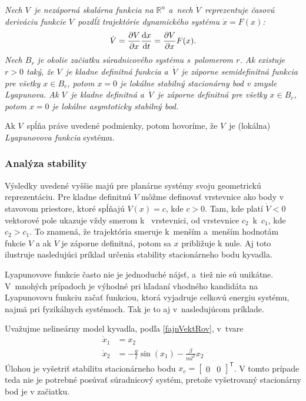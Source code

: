 \documentclass[a4paper, 10pt, ]{article}
\begin{document}
\noindent
{ \it
Nech $V$~je nezáporná skalárna funkcia na $\mathbb{R}^n$ a~nech $\dot{V}$~reprezentuje časovú deriváciu funkcie $V$~pozdĺž trajektórie dynamického systému $\dot{x} = F(x)$:
\begin{equation*}
	\dot{V} = \frac{\partial V}{\partial x} \frac{\text{\rm d}x}{\text{\rm d}t} = \frac{\partial V}{\partial x}F(x).
\end{equation*}
Nech $B_r$ je okolie začiatku súradnicového systému s~polomerom $r$. Ak existuje $r > 0$ taký, že $V$~je kladne definitná funkcia a~$\dot{V}$~je záporne semidefinitná funkcia pre všetky $x \in B_r$, potom $x = 0$ je lokálne stabilný stacionárny bod v zmysle Lyapunova. Ak $V$~je kladne definitná a~$\dot{V}$~je záporne definitná pre všetky $x \in B_r$, potom $x = 0$ je lokálne asymtoticky stabilný bod.
}

Ak $V$~spĺňa práve uvedené podmienky, potom hovoríme, že $V$~je (lokálna) \emph{Lyapunovova funkcia} systému.










\subsubsection{Analýza stability}

Výsledky uvedené vyššie majú pre planárne systémy svoju geometrickú reprezentáciu. Pre kladne definitnú $V$ môžme definovať vrstevnice ako body v stavovom priestore, ktoré spĺňajú $V(x) = c$, kde $c>0$. Tam, kde platí $\dot{V}<0$  vektorové pole ukazuje vždy smerom k~ vrstevnici, od vrstevnice $c_2$~k~$c_1$, kde $c_2 > c_1$. To znamená, že trajektória smeruje k~menším a~menším hodnotám fukcie $V$ a ak $\dot{V}$ je záporne definitná, potom sa $x$ približuje k nule. Aj toto ilustruje nasledujúci príklad určenia stability stacionárneho bodu kyvadla.

Lyapunovove funkcie často nie je jednoduché nájsť, a~tiež nie sú unikátne. V~mnohých prípadoch je výhodné pri hľadaní vhodného kandidáta na Lyapunovovu funkciu začať funkciou, ktorá vyjadruje celkovú energiu systému, najmä pri fyzikálnych systémoch. Tak je to aj v~nasledujúcom príklade.

Uvažujme nelineárny model kyvadla, podľa \eqref{fajnVektRov}, v~tvare
\begin{subequations} \label{LePovodnySystem}
	\begin{align}
		\dot{x}_1  &= x_2 \\
		\dot{x}_2  &= -\frac{g}{l} \sin(x_1) - \frac{\beta}{ml^2} x_2
	\end{align}
\end{subequations}
Úlohou je vyšetriť stabilitu stacionárneho bodu $x_e = \begin{bmatrix} 0 & 0  \end{bmatrix}^\mathsf{T}$. V tomto prípade teda nie je potrebné posúvať súradnicový systém, pretože vyšetrovaný stacionárny bod je v začiatku.
\end{document}
